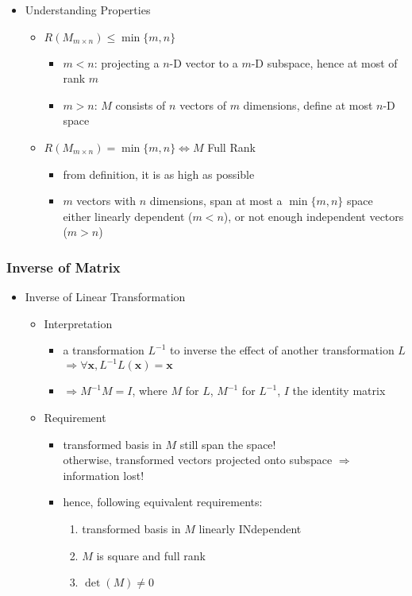 \begin{itemize}
\item Understanding Properties
	\begin{itemize}
	\item $R(M_{m\times n}) \leq \min\{m, n\}$
		\begin{itemize}
		\item $m<n$: projecting a $n$-D vector to a $m$-D subspace, hence at most of rank $m$
		\item $m>n$: $M$ consists of $n$ vectors of $m$ dimensions, define at most $n$-D space
		\end{itemize}
	\item $R(M_{m\times n}) = \min\{m, n\} \Leftrightarrow M$ Full Rank
		\begin{itemize}
		\item from definition, it is as high as possible
		\item $m$ vectors with $n$ dimensions, span at most a $\min\{m, n\}$ space \\ 
		either linearly dependent ($m<n$), or not enough independent vectors ($m>n$)
		\end{itemize}
	\end{itemize}
\end{itemize}

\subsubsection{Inverse of Matrix}
\begin{itemize}
\item Inverse of Linear Transformation
	\begin{itemize}
	\item Interpretation
		\begin{itemize}
		\item a transformation $L^{-1}$ to inverse the effect of another transformation $L$ \\
		$\Rightarrow \forall \mathbf x, L^{-1}L(\mathbf x) = \mathbf x$
		\item $\Rightarrow M^{-1}M = I$, where $M$ for $L$, $M^{-1}$ for $L^{-1}$, $I$ the identity matrix
		\end{itemize}
	\item Requirement
		\begin{itemize}
		\item transformed basis in $M$ still span the space! \\
		otherwise, transformed vectors projected onto subspace $\Rightarrow$ information lost!
		\item hence, following equivalent requirements:
			\begin{enumerate}
			\item transformed basis in $M$ linearly INdependent
			\item $M$ is square and full rank
			\item $\det(M)\neq 0$
			\end{enumerate}
		\end{itemize}
	\end{itemize}
\end{itemize}


